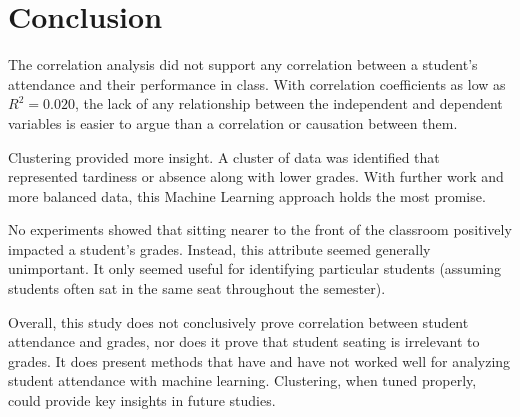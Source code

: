 \section{Conclusion}
The correlation analysis did not support any correlation between a student's attendance and their performance in class. With correlation coefficients as low as $R^2=0.020$, the lack of any relationship between the independent and dependent variables is easier to argue than a correlation or causation between them.

Clustering provided more insight. A cluster of data was identified that represented tardiness or absence along with lower grades. With further work and more balanced data, this Machine Learning approach holds the most promise.

No experiments showed that sitting nearer to the front of the classroom positively impacted a student's grades. Instead, this attribute seemed generally unimportant. It only seemed useful for identifying particular students (assuming students often sat in the same seat throughout the semester).

Overall, this study does not conclusively prove correlation between student attendance and grades, nor does it prove that student seating is irrelevant to grades. It does present methods that have and have not worked well for analyzing student attendance with machine learning. Clustering, when tuned properly, could provide key insights in future studies.
